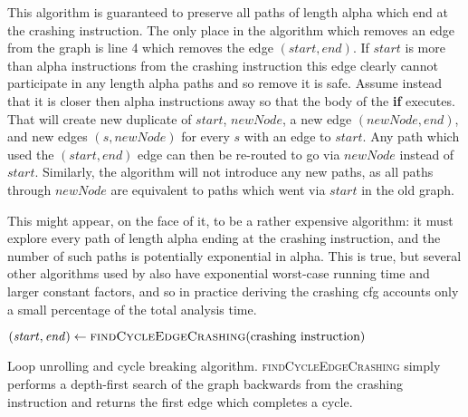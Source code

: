  This algorithm is
guaranteed to preserve all paths of length \gls{alpha} which end at
the crashing instruction.  The only place in the algorithm which
removes an edge from the graph is line 4 which removes the edge
$(\mathit{start}, \mathit{end})$.  If $\mathit{start}$ is more than
\gls{alpha} instructions from the crashing instruction this edge clearly
cannot participate in any length \gls{alpha} paths and so remove it is
safe.  Assume instead that it is closer then \gls{alpha} instructions
away so that the body of the \textbf{if} executes.  That will create
new duplicate of $\mathit{start}$, $\mathit{newNode}$, a new edge
$(\mathit{newNode}, \mathit{end})$, and new edges $(s,
\mathit{newNode})$ for every $s$ with an edge to $\mathit{start}$.
Any path which used the $(\mathit{start}, \mathit{end})$ edge can then
be re-routed to go via $\mathit{newNode}$ instead of $\mathit{start}$.
Similarly, the algorithm will not introduce any new paths, as all
paths through $\mathit{newNode}$ are equivalent to paths which went
via $\mathit{start}$ in the old graph.

This might appear, on the face of it, to be a rather expensive
algorithm: it must explore every path of length \gls{alpha} ending at
the crashing instruction, and the number of such paths is potentially
exponential in \gls{alpha}.  This is true, but several other
algorithms used by {\implementation} also have exponential worst-case
running time and larger constant factors, and so in practice deriving
the crashing \gls{cfg} accounts only a small percentage of the total
analysis time.

\begin{sanefig}
\begin{algorithmic}[1]
     \State $(\mathit{start}, \mathit{end}) \gets \textsc{findCycleEdgeCrashing}(\text{crashing instruction})$
        \EndFor
     \EndIf
  \EndWhile
  \EndFunction
\end{algorithmic}
\caption{Loop unrolling and cycle breaking algorithm.
  \textsc{findCycleEdgeCrashing} simply performs a depth-first search
  of the graph backwards from the crashing instruction and returns the
  first edge which completes a cycle.}
\label{fig:derive:read:unroll_cycle_break}
\end{sanefig}

